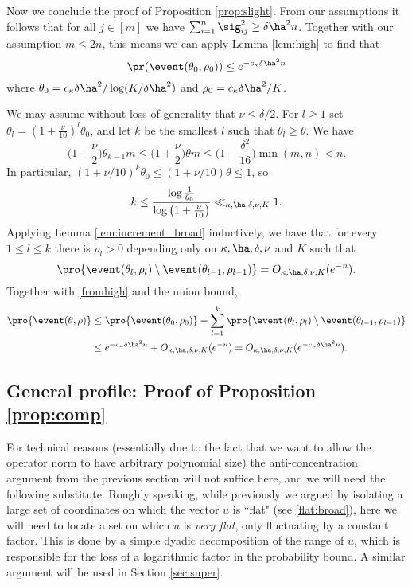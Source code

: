 \documentclass[aop,preprint]{imsart}
\theoremstyle{plain}
\theoremstyle{definition}
\theoremstyle{remark}
\numberwithin{equation}{section}
\numberwithin{theorem}{section}
\begin{document}
Now we conclude the proof of Proposition \ref{prop:slight}.
From our assumptions it follows that for all $j\in[m]$ we have $\sum_{i=1}^n \sig_{ij}^2 \ge \delta\ha^2n$.
Together with our assumption $m\le 2n$, this means we can apply Lemma \ref{lem:high} to find that 
\begin{equation}	\label{fromhigh}
\pr(\event(\theta_0,\rho_0)) \le e^{-c_\kappa\delta\ha^2n}
\end{equation}
where $\theta_0= c_\kappa\delta\ha^2/\log(K/\delta\ha^2)$ and $\rho_0=c_\kappa\delta\ha^2/K$.

We may assume without loss of generality that $\nu\le \delta/2$.
For $l\ge1$ set $\theta_l=(1+\frac{\nu}{10})^l\theta_0$, and let $k$ be the smallest $l$ such that $\theta_l\ge \theta$.
We have
\[
\Big(1+\frac{\nu}{2}\Big)\theta_{k-1}m \le \Big(1+\frac{\nu}{2}\Big)\theta m \le \Big(1-\frac{\delta^2}{16}\Big)\min(m,n)<n.
\]
In particular, $(1+\nu/10)^k\theta_0\le (1+\nu/10)\theta\le 1$, so
\begin{equation}
k\le \frac{\log\frac1{\theta_0}}{\log\big(1+\frac{\nu}{10}\big)} \ll_{\kappa,\ha,\delta,\nu,K}1.
\end{equation}
Applying Lemma \ref{lem:increment_broad} inductively, we have that for every $1\le l\le k$ there is $\rho_l>0$ depending only on $\kappa,\ha,\delta,\nu$ and $K$ such that
\begin{equation}
\pro{ \event(\theta_l,\rho_l)\setminus \event(\theta_{l-1},\rho_{l-1})} = O_{\kappa,\ha,\delta,\nu,K}(e^{-n}).
\end{equation}
Together with \eqref{fromhigh} and the union bound,
\begin{align*}
\pro{ \event(\theta,\rho)} &\le \pro{\event(\theta_0,\rho_0)} + \sum_{l=1}^k \pro{\event(\theta_l,\rho_l)\setminus \event(\theta_{l-1},\rho_{l-1})}\\
&\le e^{-c_\kappa\delta\ha^2n} + O_{\kappa,\ha,\delta,\nu,K}(e^{-n}) = O_{\kappa,\ha,\delta,\nu,K}(e^{-c_\kappa\delta\ha^2n}).
\end{align*}



\subsection{General profile: Proof of Proposition \ref{prop:comp}}

For technical reasons (essentially due to the fact that we want to allow the operator norm to have arbitrary polynomial size) the anti-concentration argument from the previous section will not suffice here, and we will need the following substitute.
Roughly speaking, while previously we argued by isolating a large set of coordinates on which the vector $u$ is ``flat" (see \eqref{flat:broad}), here we will need to locate a set on which $u$ is \emph{very flat}, only fluctuating by a constant factor.
This is done by a simple dyadic decomposition of the range of $u$, which is responsible for the loss of a logarithmic factor in the probability bound.
A similar argument will be used in Section \ref{sec:super}.
\end{document}

